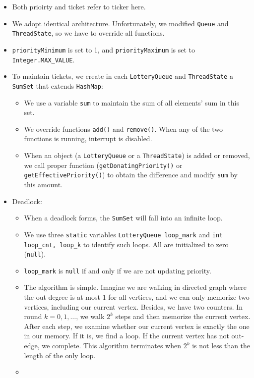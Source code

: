 \documentclass{article}
\begin{document}
\begin{itemize}
\item
Both prioirty and ticket refer to ticker here.
\item
We adopt identical architecture.
Unfortunately, we modified \texttt{Queue} and \texttt{ThreadState}, so we have to override all functions.
\item
\texttt{priorityMinimum} is set to 1, and \texttt{priorityMaximum} is set to \texttt{Integer.MAX\_VALUE}.
\item
To maintain tickets, we create in each \texttt{LotteryQueue} and \texttt{ThreadState} a \texttt{SumSet} that extends \texttt{HashMap}:
	\begin{itemize}
	\item
	We use a variable \texttt{sum} to maintain the sum of all elements' sum in this set.
	\item
	We override functions \texttt{add()} and \texttt{remove()}.
	When any of the two functions is running, interrupt is disabled.
	\item
	When an object (a \texttt{LotteryQueue} or a \texttt{ThreadState}) is added or removed, we call proper function (\texttt{getDonatingPriority()} or \texttt{getEffectivePriority()}) to obtain the difference and modify \texttt{sum} by this amount.
	\end{itemize}
\item
Deadlock:
	\begin{itemize}
	\item
	When a deadlock forms, the \texttt{SumSet} will fall into an infinite loop.
	\item
	We use three \texttt{static} variables \texttt{LotteryQueue loop\_mark} and \texttt{int loop\_cnt, loop\_k} to identify such loops.
	All are initialized to zero (\texttt{null}).
	\item
	\texttt{loop\_mark} is \texttt{null} if and only if we are not updating priority.
	\item
	The algorithm is simple.
	Imagine we are walking in directed graph where the out-degree is at most 1 for all vertices, and we can only memorize two vertices, including our current vertex.
	Besides, we have two counters.
	In round $k=0,1,\ldots$, we walk $2^k$ steps and then memorize the current vertex.
	After each step, we examine whether our current vertex is exactly the one in our memory.
	If it is, we find a loop.
	If the current vertex has not out-edge, we complete.
	This algorithm terminates when $2^k$ is not less than the length of the only loop.
	\item

\end{itemize}
\end{itemize}
\end{document}
